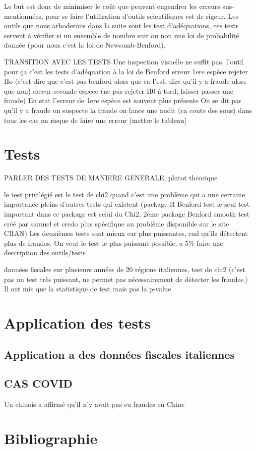 \documentclass[
  12pt,
]{article}
\begin{document}
Le but est donc de minimiser le coût que peuvent engendrer les erreurs
sus-mentionnées, pour se faire l'utilisation d'outils scientifiques est
de rigeur. Les outils que nous arboderons dans la suite sont les test
d'adéquations, ces tests servent à vérifier si un ensemble de nombre
suit ou non une loi de probabilité donnée (pour nous c'est la loi de
Newcomb-Benford).

TRANSITION AVEC LES TESTS Une inspection visuelle ne suffit pas, l'outil
pour ça c'est les tests d'adéquation à la loi de Benford erreur 1ere
espèce rejeter Ho (c'est dire que c'est pas benford alors que ca l'est,
dire qu'il y a fraude alors que non) erreur seconde espece (ne pas
rejeter H0 à tord, laisser passer une fraude) En stat l'erreur de 1ere
espèce est souvent plus présente On se dit pas qu'il y a fraude on
suspecte la fraude on lance une audit (ca coute des sous) dans tous les
cas on risque de faire une erreur (mettre le tableau)

\hypertarget{tests}{%
\section{Tests}\label{tests}}

PARLER DES TESTS DE MANIERE GENERALE, plutot theorique

le test privilégié est le test de chi2 quand c'est une problème qui a
une certaine importance pleins d'autres tests qui existent (package R
Benford test le seul test important dans ce package est celui du Chi2,
2ème package Benford smooth test créé par samuel et credo plus
spécifique au problème disponible sur le site CRAN) Les deuxièmes tests
sont mieux car plus puissantes, cad qu'ils détectent plus de fraudes. On
veut le test le plus puissant possible, a 5\% faire une description des
outils/tests

données fiscales sur plusieurs années de 20 régions italiennes, test de
chi2 (c'est pas un test très puissant, ne permet pas nécessairement de
détecter les fraudes.) Il ont mis que la statistique de test mais pas la
p-value

\hypertarget{application-des-tests}{%
\section{Application des tests}\label{application-des-tests}}

\hypertarget{application-a-des-donnuxe9es-fiscales-italiennes}{%
\subsection{Application a des données fiscales
italiennes}\label{application-a-des-donnuxe9es-fiscales-italiennes}}

\hypertarget{cas-covid}{%
\subsection{CAS COVID}\label{cas-covid}}

Un chinois a affirmé qu'il n'y avait pas eu fraudes en Chine

\hypertarget{bibliographie}{%
\section{Bibliographie}\label{bibliographie}}
\end{document}
